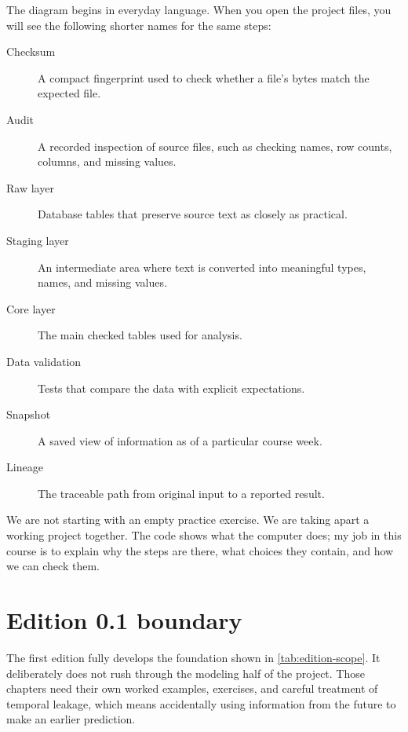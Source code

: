 The diagram begins in everyday language. When you open the project files, you
will see the following shorter names for the same steps:
\begin{description}
  \item[Checksum] A compact fingerprint used to check whether a file's bytes
    match the expected file.
  \item[Audit] A recorded inspection of source files, such as checking names,
    row counts, columns, and missing values.
  \item[Raw layer] Database tables that preserve source text as closely as
    practical.
  \item[Staging layer] An intermediate area where text is converted into
    meaningful types, names, and missing values.
  \item[Core layer] The main checked tables used for analysis.
  \item[Data validation] Tests that compare the data with explicit
    expectations.
  \item[Snapshot] A saved view of information as of a particular course week.
  \item[Lineage] The traceable path from original input to a reported result.
\end{description}

\begin{plainlanguage}
We are not starting with an empty practice exercise. We are taking apart a
working project together. The code shows what the computer does; my job in this
course is to explain why the steps are there, what choices they contain, and
how we can check them.
\end{plainlanguage}

\section{Edition 0.1 boundary}

The first edition fully develops the foundation shown in
\cref{tab:edition-scope}. It deliberately does not rush through the modeling
half of the project. Those chapters need their own worked examples, exercises,
and careful treatment of temporal leakage, which means accidentally using
information from the future to make an earlier prediction.

